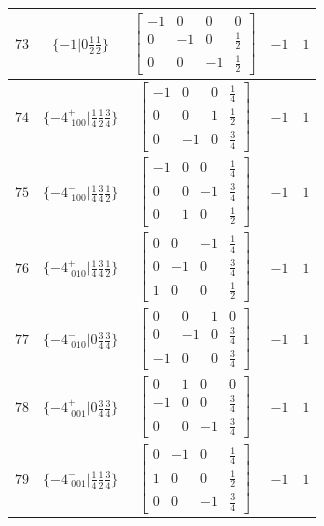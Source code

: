\documentclass[fleqn,8pt]{jsarticle}
\begin{document}
\begin{longtable}{ccccc}
$ 73 $ & $ \{-1|0 \frac{1}{2} \frac{1}{2}\} $ & $ \begin{bmatrix} -1 & 0 & 0 & 0 \\ 0 & -1 & 0 & \frac{1}{2} \\ 0 & 0 & -1 & \frac{1}{2} \end{bmatrix} $ & $ -1 $ & $ 1 $ \\ \hline
$ 74 $ & $ \{-4^{+}_{\,\,100}|\frac{1}{4} \frac{1}{2} \frac{3}{4}\} $ & $ \begin{bmatrix} -1 & 0 & 0 & \frac{1}{4} \\ 0 & 0 & 1 & \frac{1}{2} \\ 0 & -1 & 0 & \frac{3}{4} \end{bmatrix} $ & $ -1 $ & $ 1 $ \\ \hline
$ 75 $ & $ \{-4^{-}_{\,\,100}|\frac{1}{4} \frac{3}{4} \frac{1}{2}\} $ & $ \begin{bmatrix} -1 & 0 & 0 & \frac{1}{4} \\ 0 & 0 & -1 & \frac{3}{4} \\ 0 & 1 & 0 & \frac{1}{2} \end{bmatrix} $ & $ -1 $ & $ 1 $ \\ \hline
$ 76 $ & $ \{-4^{+}_{\,\,010}|\frac{1}{4} \frac{3}{4} \frac{1}{2}\} $ & $ \begin{bmatrix} 0 & 0 & -1 & \frac{1}{4} \\ 0 & -1 & 0 & \frac{3}{4} \\ 1 & 0 & 0 & \frac{1}{2} \end{bmatrix} $ & $ -1 $ & $ 1 $ \\ \hline
$ 77 $ & $ \{-4^{-}_{\,\,010}|0 \frac{3}{4} \frac{3}{4}\} $ & $ \begin{bmatrix} 0 & 0 & 1 & 0 \\ 0 & -1 & 0 & \frac{3}{4} \\ -1 & 0 & 0 & \frac{3}{4} \end{bmatrix} $ & $ -1 $ & $ 1 $ \\ \hline
$ 78 $ & $ \{-4^{+}_{\,\,001}|0 \frac{3}{4} \frac{3}{4}\} $ & $ \begin{bmatrix} 0 & 1 & 0 & 0 \\ -1 & 0 & 0 & \frac{3}{4} \\ 0 & 0 & -1 & \frac{3}{4} \end{bmatrix} $ & $ -1 $ & $ 1 $ \\ \hline
$ 79 $ & $ \{-4^{-}_{\,\,001}|\frac{1}{4} \frac{1}{2} \frac{3}{4}\} $ & $ \begin{bmatrix} 0 & -1 & 0 & \frac{1}{4} \\ 1 & 0 & 0 & \frac{1}{2} \\ 0 & 0 & -1 & \frac{3}{4} \end{bmatrix} $ & $ -1 $ & $ 1 $ \\ \hline

\end{longtable}
\end{document}
